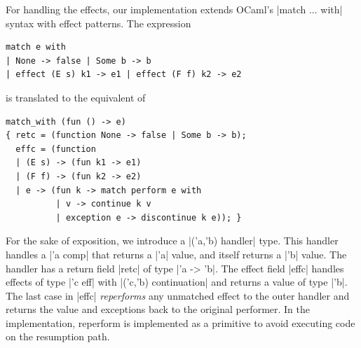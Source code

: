 \documentclass[sigplan,screen]{acmart}
\begin{document}
For handling the effects, our implementation extends OCaml's |match ... with|
syntax with effect patterns. The expression
\begin{lstlisting}
match e with
| None -> false | Some b -> b
| effect (E s) k1 -> e1 | effect (F f) k2 -> e2
\end{lstlisting}
\noindent is translated to the equivalent of
\begin{lstlisting}
match_with (fun () -> e)
{ retc = (function None -> false | Some b -> b);
  effc = (function
  | (E s) -> (fun k1 -> e1)
  | (F f) -> (fun k2 -> e2)
  | e -> (fun k -> match perform e with
          | v -> continue k v
          | exception e -> discontinue k e)); }
\end{lstlisting}
For the sake of exposition, we introduce a |('a,'b) handler| type. This handler
handles a |'a comp| that returns a |'a| value, and itself returns a |'b| value.
The handler has a return field |retc| of type |'a -> 'b|. The effect field
|effc| handles effects of type |'c eff| with |('c,'b) continuation| and returns
a value of type |'b|. The last case in |effc| \emph{reperforms} any unmatched
effect to the outer handler and returns the value and exceptions back to the
original performer. In the implementation, reperform is implemented as a
primitive to avoid executing code on the resumption path.
\end{document}
